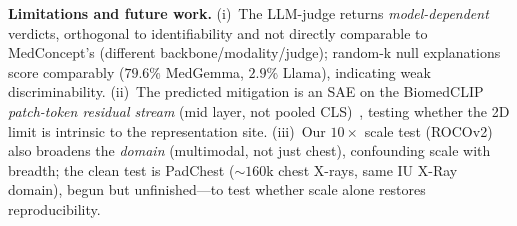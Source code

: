 \documentclass[sigconf, nonacm]{acmart}
\begin{document}
\textbf{Limitations and future work.} (i)~The LLM-judge returns \emph{model-dependent} verdicts, orthogonal to identifiability and not directly comparable to MedConcept's (different backbone/modality/judge); random-k null explanations score comparably ($79.6\%$ MedGemma, $2.9\%$ Llama), indicating weak discriminability. (ii)~The predicted mitigation is an SAE on the BiomedCLIP \emph{patch-token residual stream} (mid layer, not pooled CLS)~\cite{bricken2023monosemanticity}, testing whether the 2D limit is intrinsic to the representation site. (iii)~Our $10{\times}$ scale test (ROCOv2) also broadens the \emph{domain} (multimodal, not just chest), confounding scale with breadth; the clean test is PadChest (${\sim}160$k chest X-rays, same IU X-Ray domain), begun but unfinished---to test whether scale alone restores reproducibility.



\end{document}
